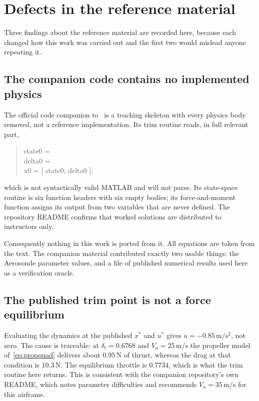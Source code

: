 \documentclass[11pt,a4paper]{article}
\newcommand{\dt}{\delta_t}
\begin{document}
\section{Defects in the reference material}\label{sec:refdefects}

Three findings about the reference material are recorded here, because each
changed how this work was carried out and the first two would mislead anyone
repeating it.

\subsection{The companion code contains no implemented physics}

The official code companion to~\cite{beard} is a teaching skeleton with every
physics body removed, not a reference implementation. Its trim routine reads, in
full relevant part,
\begin{quote}\ttfamily
state0 = \\
delta0 = \\
x0 = [ state0; delta0 ];
\end{quote}
which is not syntactically valid MATLAB and will not parse. Its state-space
routine is six function headers with six empty bodies; its force-and-moment
function assigns its output from two variables that are never defined. The
repository README confirms that worked solutions are distributed to instructors
only.

Consequently nothing in this work is ported from it. All equations are taken from
the text. The companion material contributed exactly two usable things: the
Aerosonde parameter values, and a file of published numerical results used here as
a verification oracle.

\subsection{The published trim point is not a force equilibrium}

Evaluating the dynamics at the published $x^*$ and $u^*$ gives
$\dot u = -0.85\,\mathrm{m/s^2}$, not zero. The cause is traceable: at
$\dt = 0.6768$ and $V_a = 25\,\mathrm{m/s}$ the propeller model
of~\eqref{eq:propquad} delivers about $0.95\,\mathrm{N}$ of thrust, whereas the
drag at that condition is $10.3\,\mathrm{N}$. The equilibrium throttle is
$0.7734$, which is what the trim routine here returns. This is consistent with the
companion repository's own README, which notes parameter difficulties and
recommends $V_a = 35\,\mathrm{m/s}$ for this airframe.
\end{document}
